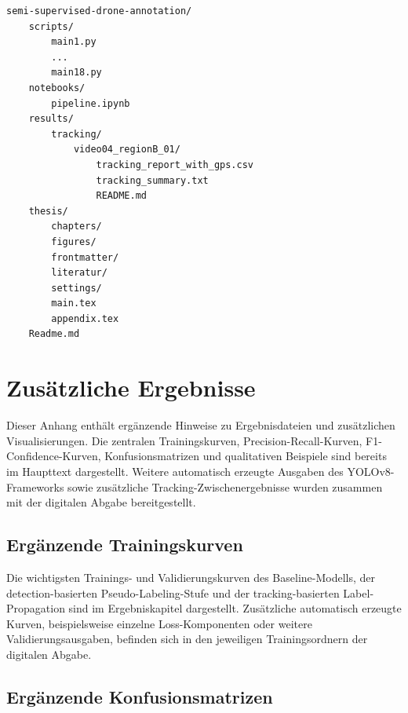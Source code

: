 \begin{verbatim}
semi-supervised-drone-annotation/
    scripts/
        main1.py
        ...
        main18.py
    notebooks/
        pipeline.ipynb
    results/
        tracking/
            video04_regionB_01/
                tracking_report_with_gps.csv
                tracking_summary.txt
                README.md
    thesis/
        chapters/
        figures/
        frontmatter/
        literatur/
        settings/
        main.tex
        appendix.tex
    Readme.md
\end{verbatim}


\section{Zusätzliche Ergebnisse}
\label{app:ergebnisse}

Dieser Anhang enthält ergänzende Hinweise zu Ergebnisdateien und zusätzlichen
Visualisierungen. Die zentralen Trainingskurven, Precision-Recall-Kurven,
F1-Confidence-Kurven, Konfusionsmatrizen und qualitativen Beispiele sind bereits
im Haupttext dargestellt. Weitere automatisch erzeugte Ausgaben des YOLOv8-
Frameworks sowie zusätzliche Tracking-Zwischenergebnisse wurden zusammen mit
der digitalen Abgabe bereitgestellt.

\subsection{Ergänzende Trainingskurven}

Die wichtigsten Trainings- und Validierungskurven des Baseline-Modells, der
detection-basierten Pseudo-Labeling-Stufe und der tracking-basierten
Label-Propagation sind im Ergebniskapitel dargestellt. Zusätzliche automatisch
erzeugte Kurven, beispielsweise einzelne Loss-Komponenten oder weitere
Validierungsausgaben, befinden sich in den jeweiligen Trainingsordnern der
digitalen Abgabe.

%

\subsection{Ergänzende Konfusionsmatrizen}

